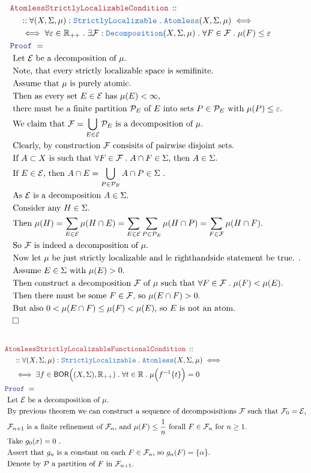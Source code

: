 \documentclass[12pt]{scrartcl}
\newcommand{\TYPE}[1]{\textcolor{NavyBlue}{\mathtt{#1}}}
\newcommand{\LOGIC}[1]{\textcolor{Blue}{\mathtt{#1}}}
\newcommand{\THM}[1]{\textcolor{Maroon}{\mathtt{#1}}}
\renewcommand{\.}{\; . \;}
\newcommand{\Theorem}[2]{& \THM{#1} \, :: \, #2 \\ & \Proof = \\ }
\newcommand{\NewLine}{\\ & \kern 1pc}
\newcommand{\Page}[1]{ \begin{align*} #1 \end{align*}   }
\newcommand{\Reals}{\mathbb{R} }
\newcommand{\QED}{\; \square}
\newcommand{\EndProof}{& \QED \\}
\newcommand{\Proof}{\LOGIC{Proof} \; }
\newcommand{\Explain}[1]{& \text{#1.} \\}
\newcommand{\ExplainFurther}[1]{& \text{#1} \\}
\newcommand{\Aless}{\TYPE{Atomless}}
\newcommand{\BOR}{\mathsf{BOR}}
\newcommand{\SLoc}{\TYPE{StrictlyLocalizable}}
\newcommand{\F}{\mathcal{F}}
\newcommand{\E}{\mathcal{E}}
\begin{document}
\Page{
	\Theorem{AtomlessStrictlyLocalizableCondition}
	{
		\NewLine ::		
		\forall (X,\Sigma,\mu) : \SLoc \.
		\Aless (X,\Sigma,\mu) \iff \NewLine \iff
		\forall \varepsilon \in \Reals_{++} \.
		\exists \F : \TYPE{Decomposition}(X,\Sigma,\mu) \.
		\forall F \in \F \. \mu(F) \le \varepsilon
	}
	\Explain{ 
		Let $\E$ be a decomposition of $\mu$}
	\Explain{ 
		Note, that every strictly localizable space is semifinite}
	\Explain{
		Assume that $\mu$ is purely atomic}
	\ExplainFurther{
		Then as every set $E \in \E$ has $\mu(E) < \infty$,}
	\Explain{
		there must be a finite partition $\mathcal{P}_E$ of $E$ into
		sets $P \in \mathcal{P}_E$ with $\mu(P) \le \varepsilon$}
	\Explain{
		We claim that $\F = \bigcup_{E \in \E} \mathcal{P}_E$ is a
		decomposition of $\mu$}
	\Explain{
		Clearly, by construction $\F$ consisits of pairwise disjoint sets}
	\Explain{
		If $A \subset X$ is such that $\forall F \in \F \. A \cap F \in \Sigma$, then
		$A\in \Sigma$}
	\Explain{
		If $E \in \E$, then $A \cap E = \bigcup_{P \in \mathcal{P}_E} A \cap P \in \Sigma $ }
	\Explain{
		As $\E$ is a decomposition $A \in \Sigma$} 
	\Explain{
		Consider any $H \in \Sigma$}
	\Explain{
		Then $\mu(H) = 
			\sum_{E \in \E} \mu(H \cap E) = 
			\sum_{E \in \E} \sum_{P \in \mathcal{P}_E} \mu(H \cap P) =
			\sum_{F \in \F} \mu(H \cap F)$}
	\Explain{ 
		So $\F$ is indeed a decomposition of $\mu$}
	\Explain{
		Now let $\mu$ be just strictly localizable and le righthandside statement be true.
	}
	\Explain{
		Assume $E\in \Sigma$ with $\mu(E) > 0$}
	\Explain{
		Then construct a decomposition $\F$ of $\mu$
		such that $\forall F \in \F \. \mu(F) < \mu(E)$}
	\Explain{
		Then there must be some $F \in \F$, so $\mu(E \cap F) > 0$}
	\Explain{ 
		But also $ 0 < \mu(E \cap F) \le \mu(F) < \mu(E)$,
		so $E$ is not an atom}
	\EndProof
	\\
}\Page{
	\Theorem{AtomlessStrictlyLocalizableFunctionalCondition}
	{
		\NewLine ::		
		\forall (X,\Sigma,\mu) : \SLoc \.
		\Aless (X,\Sigma,\mu) \iff \NewLine \iff
		\exists f \in \BOR\Big((X,\Sigma),\Reals_{++}) \.
		\forall t \in \Reals \.
		\mu\Big(f^{-1}\{t\}\Big) = 0
	}
	\Explain{ 
		Let $\E$ be a decomposition of $\mu$}
	\ExplainFurther{
		By previous theorem we can construct a sequence of decomposisitions
		$\F$ such that $\F_0 = \E$,} 
	\Explain{
		$\F_{n+1}$ is a finite refinement of $\F_n$,
		and $\mu(F) \le \frac{1}{n}$ forall $F \in \F_n$ for $n \ge 1$}
	\Explain{
		Take $g_0(x) = 0$
	}
	\Explain{
		Assert that $g_n$ is a constant on each $F \in \F_n$, so $g_n(F) = \{\alpha\}$}
	\Explain{
		Denote by $\mathcal{P}$ a partition of $F$ in $\F_{n+1}$}
}
\end{document}
